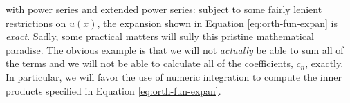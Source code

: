  with power series and extended power series: subject to some fairly lenient restrictions on $u(x)$, the expansion shown in Equation \ref{eq:orth-fun-expan} is \emph{exact}.  Sadly, some practical matters will sully this pristine mathematical paradise.  The obvious example is that we will not \emph{actually} be able to sum all of the terms and we will not be able to calculate all of the coefficients, $c_n$, exactly.  In particular, we will favor the use of numeric integration to compute the inner products specified in Equation \ref{eq:orth-fun-expan}.   
